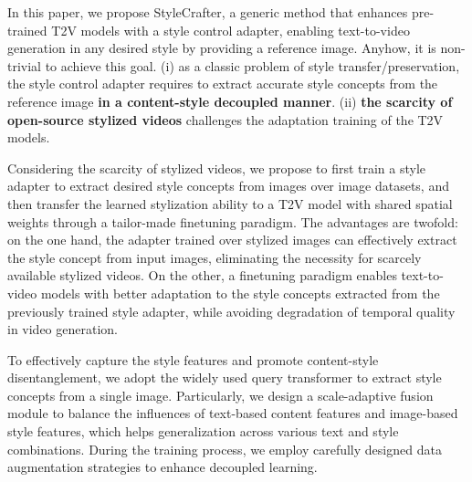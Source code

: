 In this paper, we propose StyleCrafter, a generic method that enhances pre-trained T2V models with a style control adapter, enabling text-to-video generation in any desired style by providing a reference image. 
Anyhow, it is non-trivial to achieve this goal. (i) as a classic problem of style transfer/preservation, the style control adapter requires to extract accurate style concepts from the reference image \textbf{in a content-style decoupled manner}. (ii) \textbf{the scarcity of open-source stylized videos} challenges the adaptation training of the T2V models.

Considering the scarcity of stylized videos, we propose to first train a style adapter to extract desired style concepts from images over image datasets, and then transfer the learned stylization ability to a T2V model with shared spatial weights through a tailor-made finetuning paradigm. The advantages are twofold: on the one hand, the adapter trained over stylized images can effectively extract the style concept from input images, eliminating the necessity for scarcely available stylized videos. On the other, a finetuning paradigm enables text-to-video models with better adaptation to the style concepts extracted from the previously trained style adapter, while avoiding degradation of temporal quality in video generation. 

To effectively capture the style features and promote content-style disentanglement, we adopt the widely used query transformer to extract style concepts from a single image. Particularly, we design a scale-adaptive fusion module to balance the influences of text-based content features and image-based style features, which helps generalization across various text and style combinations. During the training process, we employ carefully designed data augmentation strategies to enhance decoupled learning.

